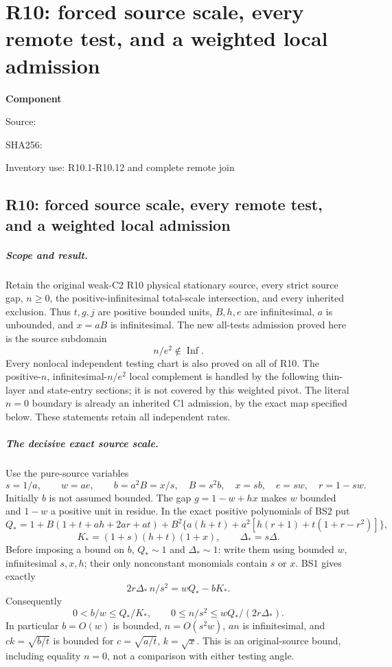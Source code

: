 \chapter{R10: forced source scale, every remote test, and a weighted local admission}
\label{component:p9ee4ba7326a7}
\noindent\textbf{Component }\par
{\small\noindent Source: \par}
{\small\noindent SHA256: \par}
{\small\noindent Inventory use: R10.1-R10.12 and complete remote join\par}
\medskip
\section{R10: forced source scale, every remote test, and a weighted local admission}

\paragraph{Scope and result.}
Retain the original weak-C2 R10 physical stationary source, every strict
source gap, $n\ge0$, the positive-infinitesimal total-scale intersection,
and every inherited exclusion. Thus $t,g,j$ are positive bounded units,
$B,h,e$ are infinitesimal, $a$ is unbounded, and $x=aB$ is infinitesimal.
The new all-tests admission proved here is the source subdomain
\[
                         n/e^2\notin\operatorname{Inf}.
\tag{R10.1}
\]
Every nonlocal independent testing chart is also proved on all of R10.
The positive-$n$, infinitesimal-$n/e^2$ local complement is handled by the following thin-layer and state-entry sections; it is not covered by this weighted pivot.
The literal $n=0$ boundary is already an inherited C1 admission, by the
exact map specified below. These statements retain all independent rates.

\paragraph{The decisive exact source scale.}
Use the pure-source variables
\[
 s=1/a,\qquad w=ae,\qquad b=a^2B=x/s,
 \quad B=s^2b,\quad x=sb,\quad e=sw,\quad r=1-sw.
\]
Initially $b$ is not assumed bounded. The gap $g=1-w+hx$ makes $w$
bounded and $1-w$ a positive unit in residue. In the exact positive
polynomials of BS2 put
\[
 Q_*=1+B(1+t+ah+2ar+at)
 +B^2\{a(h+t)+a^2[h(r+1)+t(1+r-r^2)]\},
\]
\[
 K_*=(1+s)(h+t)(1+x),\qquad \Delta_*=s\Delta.
\]
Before imposing a bound on $b$, $Q_*\sim1$ and $\Delta_*\sim1$:
write them using bounded $w$, infinitesimal $s,x,h$; their only
nonconstant monomials contain $s$ or $x$. BS1 gives exactly
\[
 \boxed{\quad 2r\Delta_*\,n/s^2=wQ_*-bK_* .\quad}
\tag{R10.2}
\]
Consequently
\[
 0<b/w\le Q_*/K_*,\qquad
 0\le n/s^2\le wQ_*/(2r\Delta_*).
\tag{R10.3}
\]
In particular $b=O(w)$ is bounded, $n=O(s^2w)$, $an$ is
infinitesimal, and $ck=\sqrt{b/t}$ is bounded for
$c=\sqrt{a/t}$, $k=\sqrt{x}$. This is an original-source bound,
including equality $n=0$, not a comparison with either testing angle.

